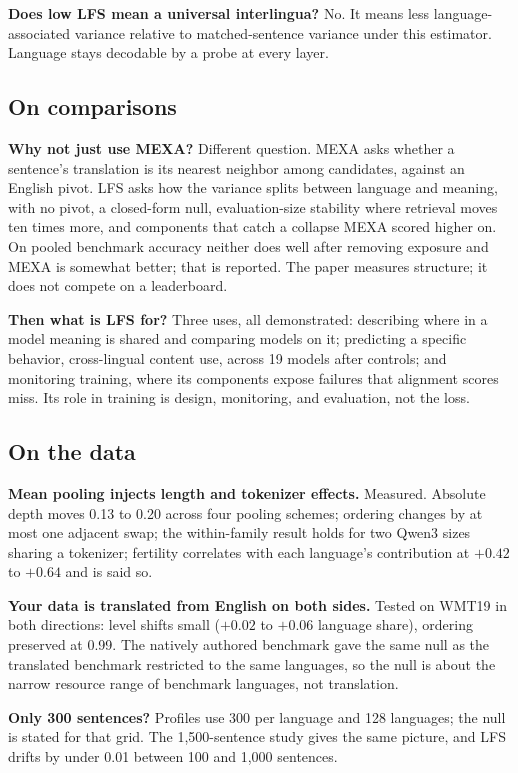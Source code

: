 \textbf{Does low LFS mean a universal interlingua?}
No. It means less language-associated variance relative to matched-sentence
variance under this estimator. Language stays decodable by a probe at every
layer.

\subsection*{On comparisons}

\textbf{Why not just use MEXA?}
Different question. MEXA asks whether a sentence's translation is its nearest
neighbor among candidates, against an English pivot. LFS asks how the
variance splits between language and meaning, with no pivot, a closed-form
null, evaluation-size stability where retrieval moves ten times more, and
components that catch a collapse MEXA scored higher on. On pooled benchmark accuracy
neither does well after removing exposure and MEXA is somewhat better; that
is reported. The paper measures structure; it does not compete on a
leaderboard.

\textbf{Then what is LFS for?}
Three uses, all demonstrated: describing where in a model meaning is shared
and comparing models on it; predicting a specific behavior, cross-lingual
content use, across 19 models after controls; and monitoring training, where
its components expose failures that alignment scores miss. Its role in
training is design, monitoring, and evaluation, not the loss.

\subsection*{On the data}

\textbf{Mean pooling injects length and tokenizer effects.}
Measured. Absolute depth moves 0.13 to 0.20 across four pooling schemes;
ordering changes by at most one adjacent swap; the within-family result holds
for two Qwen3 sizes sharing a tokenizer; fertility correlates with each
language's contribution at $+0.42$ to $+0.64$ and is said so.

\textbf{Your data is translated from English on both sides.}
Tested on WMT19 in both directions: level shifts small ($+0.02$ to $+0.06$
language share), ordering preserved at 0.99. The natively authored benchmark gave
the same null as the translated benchmark restricted to the same languages, so the
null is about the narrow resource range of benchmark languages, not translation.

\textbf{Only 300 sentences?}
Profiles use 300 per language and 128 languages; the null is stated for that
grid. The 1,500-sentence study gives the same picture, and LFS drifts by
under 0.01 between 100 and 1,000 sentences.

